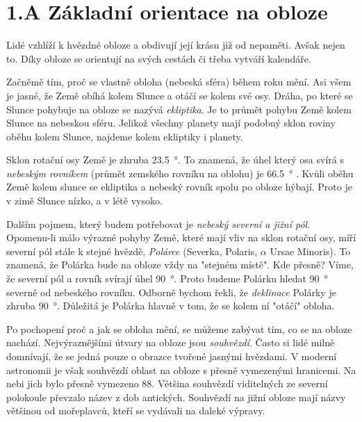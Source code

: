 \documentclass[crop=false]{standalone}
\begin{document}
\section*{1.A Základní orientace na obloze}

\quad

Lidé vzhlíží k hvězdné obloze a obdivují její krásu již od nepaměti.
Avšak nejen to.
Díky obloze se orientují na svých cestách či třeba vytváří kalendáře.

Začněmě tím, proč se vlastně obloha (nebeská sféra) během roku mění.
Asi všem je jasné, že Země obíhá kolem Slunce a otáčí se kolem své osy.
Dráha, po které se Slunce pohybuje na obloze se nazývá \textit{ekliptika}. Je to průmět pohybu Země kolem Slunce na nebeskou sféru.
Jelikož všechny planety mají podobný sklon roviny oběhu kolem Slunce, najdeme kolem ekliptiky i planety.

Sklon rotační osy Země je zhruba \qty{23,5}{\degree}.
To znamená, že úhel který osa svírá s \textit{nebeským rovníkem} (průmět zemského rovníku na oblohu) je \qty{66,5}{\degree} . 
Kvůli oběhu Země kolem slunce se ekliptika a nebeský rovník spolu po obloze hýbají.
Proto je v zimě Slunce nízko, a v létě vysoko.

Dalším pojmem, který budem potřebovat je \textit{nebeský severní a jižní pól}.
Opomenu-li málo výrazné pohyby Země, které mají vliv na sklon rotační osy, míří severní pól stále k stejné hvězdě, \textit{Polárce} (Severka, Polaris, $\alpha$ Ursae Minoris).
To znamená, že Polárka bude na obloze vždy na "stejném místě".
Kde přesně?
Víme, že severní pól a rovník svírají úhel \qty{90}{\degree}. Proto budeme Polárku hledat \qty{90}{\degree} severně od nebeského rovníku. 
Odborně bychom řekli, že \textit{deklinace} Polárky je zhruba \qty{90}{\degree}.
Důležitá je Polárka hlavně v tom, že se kolem ní "otáčí" obloha. 

Po pochopení proč a jak se obloha mění, se můžeme zabývat tím, co se na obloze nachází.
Nejvýraznějšími útvary na obloze jsou \textit{souhvězdí}.
Často si lidé milně domnívají, že se jedná pouze o obrazce tvořené jasnými hvězdami.
V moderní astronomii je však souhvězdí oblast na obloze s přesně vymezenými hranicemi.
Na nebi jich bylo přesně vymezeno 88. Většina souhvězdí  viditelných ze  severní polokoule převzalo název z dob antických.
Souhvězdí na jižní obloze mají názvy většinou od mořeplavců, kteří se vydávali na daleké výpravy.
\end{document}

